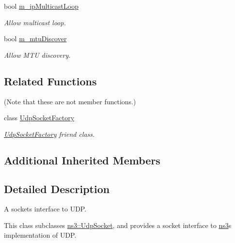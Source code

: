 \begin{DoxyCompactItemize}
bool \hyperlink{classns3_1_1UdpSocketImpl_aa201ce3516300da49c3e602e21cd6f6d}{m\+\_\+ip\+Multicast\+Loop}
\begin{DoxyCompactList}\small\item\em Allow multicast loop. \end{DoxyCompactList}\item 
bool \hyperlink{classns3_1_1UdpSocketImpl_ab5ae932e01b5746539b9ad20b3ff4f46}{m\+\_\+mtu\+Discover}
\begin{DoxyCompactList}\small\item\em Allow M\+TU discovery. \end{DoxyCompactList}\end{DoxyCompactItemize}
\subsection*{Related Functions}
(Note that these are not member functions.) \begin{DoxyCompactItemize}
\item 
class \hyperlink{classns3_1_1UdpSocketImpl_afba47205bf14e005b7444bb89be13029}{Udp\+Socket\+Factory}
\begin{DoxyCompactList}\small\item\em \hyperlink{classns3_1_1UdpSocketFactory}{Udp\+Socket\+Factory} friend class. \end{DoxyCompactList}\end{DoxyCompactItemize}
\subsection*{Additional Inherited Members}


\subsection{Detailed Description}
A sockets interface to U\+DP. 

This class subclasses \hyperlink{classns3_1_1UdpSocket}{ns3\+::\+Udp\+Socket}, and provides a socket interface to \hyperlink{namespacens3}{ns3}\textquotesingle{}s implementation of U\+DP.

